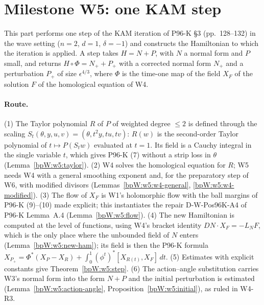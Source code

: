 \section{Milestone W5: one KAM step}\label{bpW:w5}

\providecommand{\Pc}{\mathcal P}
\providecommand{\symp}{\varpi_{\mathcal P}}
\providecommand{\Sm}{\mathcal S}

This part performs one step of the KAM iteration of P96-K \S3 (pp.~128--132) in the wave setting ($n=2$, $d=1$,
$\delta=-1$) and constructs the Hamiltonian to which the iteration is applied. A step takes $H=N+P$, with $N$ a
normal form and $P$ small, and returns $H\circ\Phi=N_++P_+$ with a corrected normal form $N_+$ and a perturbation
$P_+$ of size $\epsilon^{4/3}$, where $\Phi$ is the time-one map of the field $X_F$ of the solution $F$ of the
homological equation of W4.

\paragraph{Route.} (1) The Taylor polynomial $R$ of $P$ of weighted degree $\le2$ is defined through the scaling
$S_t(\theta,y,u,v)=(\theta,t^2y,tu,tv)$: $R(w)$ is the second-order Taylor polynomial of $t\mapsto P(S_tw)$ evaluated
at $t=1$. Its field is a Cauchy integral in the single variable $t$, which gives P96-K (7) without a strip loss in
$\theta$ (Lemma~\ref{bpW:w5:taylor}). (2) W4 solves the homological equation for $R$; W5 needs W4 with a general
smoothing exponent and, for the preparatory step of W6, with modified divisors (Lemmas~\ref{bpW:w5:w4-general},
\ref{bpW:w5:w4-modified}). (3) The flow of $X_F$ is W1's holomorphic flow with the ball margins of P96-K (9)--(10)
made explicit; this instantiates the repair D-W-Pos96K-A4 of P96-K Lemma~A.4 (Lemma~\ref{bpW:w5:flow}). (4) The new
Hamiltonian is computed at the level of functions, using W4's bracket identity $DN\cdot X_F=-L_NF$, which is the only
place where the unbounded field of $N$ enters (Lemma~\ref{bpW:w5:new-ham}); its field is then the P96-K formula
$X_{P_+}=\Phi^*(X_P-X_R)+\int_0^1(\phi^t)^*[X_{R(t)},X_F]\,dt$. (5) Estimates with explicit constants give
Theorem~\ref{bpW:w5:step}. (6) The action--angle substitution carries W3's normal form into the form $N+P$ and the
initial perturbation is estimated (Lemma~\ref{bpW:w5:action-angle}, Proposition~\ref{bpW:w5:initial}), as ruled in
W4-R3.

